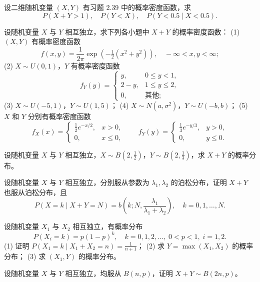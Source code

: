 \begin{homework}[2.53]
设二维随机变量 $(X,Y)$ 有习题 2.39 中的概率密度函数，求
\[
P(X+Y > 1), \quad P(Y < X), \quad P(Y < 0.5 \mid X < 0.5).
\]
\end{homework}

\begin{homework}[2.54]
设随机变量 $X$ 与 $Y$ 相互独立，求下列各小题中 $X+Y$ 的概率密度函数：  
(1) $(X,Y)$ 有概率密度函数
\[
f(x,y) = \frac{1}{2\pi} \exp\!\left(-\tfrac{1}{2}(x^2+y^2)\right),\quad -\infty < x,y < \infty;
\]
(2) $X \sim U(0,1)$，$Y$ 有概率密度函数
\[
f_Y(y)=
\begin{cases}
y, & 0 \leq y < 1, \\
2-y, & 1 \leq y \leq 2, \\
0, & \text{其他};
\end{cases}
\]
(3) $X \sim U(-5,1)$，$Y \sim U(1,5)$；  
(4) $X \sim N(a,\sigma^2)$，$Y \sim U(-b,b)$；  
(5) $X$ 和 $Y$ 分别有概率密度函数
\[
f_X(x)=
\begin{cases}
\tfrac12 e^{-x/2}, & x>0,\\
0, & x\le0,
\end{cases}
\qquad
f_Y(y)=
\begin{cases}
\tfrac13 e^{-y/3}, & y>0,\\
0, & y\le0.
\end{cases}
\]
\end{homework}

\begin{homework}[2.55]
设随机变量 $X$ 与 $Y$ 相互独立，$X \sim B\!\left(2,\tfrac12\right)$，$Y \sim B\!\left(2,\tfrac13\right)$，求 $X+Y$ 的概率分布。
\end{homework}

\begin{homework}[2.56]
设随机变量 $X$ 与 $Y$ 相互独立，分别服从参数为 $\lambda_1,\lambda_2$ 的泊松分布，证明 $X+Y$ 也服从泊松分布，且
\[
P(X = k \mid X+Y = N)
= b\!\left(k; N, \frac{\lambda_1}{\lambda_1+\lambda_2}\right),\quad k=0,1,\ldots,N.
\]
\end{homework}

\begin{homework}[2.57]
设随机变量 $X_1$ 与 $X_2$ 相互独立，有概率分布
\[
P(X_i = k) = p(1-p)^k,\quad k=0,1,2,\ldots,\; 0<p<1,\; i=1,2.
\]
(1) 证明 $P(X_1=k \mid X_1+X_2=n)=\tfrac{1}{n+1}$；  
(2) 求 $Y=\max(X_1,X_2)$ 的概率分布；  
(3) 求 $(X_1,Y)$ 的概率分布。
\end{homework}

\begin{homework}[2.58]
设随机变量 $X$ 与 $Y$ 相互独立，均服从 $B(n,p)$，证明 $X+Y \sim B(2n,p)$。
\end{homework}

